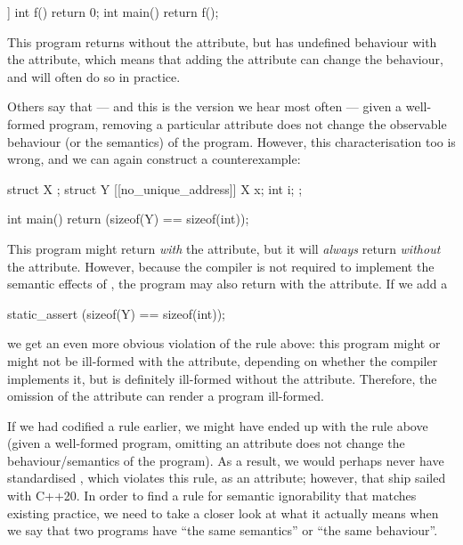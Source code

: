 \begin{codeblock}
[[noreturn]] int f() { return 0; }
int main() { return f(); }
\end{codeblock}

This program returns  without the attribute, but has undefined behaviour with the attribute, which means that adding the attribute can change the behaviour, and will often do so in practice.

Others say that --- and this is the version we hear most often --- given a well-formed program, removing a particular attribute does not change the observable behaviour (or the semantics) of the program. However, this characterisation too is wrong, and we can again construct a counterexample:

\begin{codeblock}
struct X {};
struct Y {
  [[no_unique_address]] X x;
  int i; 
};

int main() { 
  return (sizeof(Y) == sizeof(int)); 
}
\end{codeblock}

This program might return  \emph{with} the attribute, but it will \emph{always} return  \emph{without} the attribute. However, because the compiler is not required to implement the semantic effects of \mbox{}, the program may also return  with the attribute. If we add a

\begin{codeblock}
static_assert (sizeof(Y) == sizeof(int));
\end{codeblock}

we get an even more obvious violation of the rule above: this program might or might not be ill-formed with the attribute, depending on whether the compiler implements it, but is definitely ill-formed without the attribute. Therefore, the omission of the attribute can render a program ill-formed.

If we had codified a rule earlier, we might have ended up with the rule above (given a well-formed program, omitting an attribute does not change the behaviour/semantics of the program). As a result, we would perhaps never have standardised \mbox{}, which violates this rule, as an attribute; however, that ship sailed with C++20.
In order to find a rule for semantic ignorability that matches existing practice, we need to take a closer look at what it actually means when we say that two programs have ``the same semantics'' or ``the same behaviour''.


